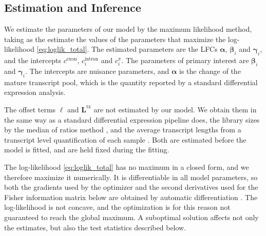 \documentclass[11pt]{article}
\begin{document}
	\subsection{Estimation and Inference} \label{subsec:estimation_inference}
	We estimate the parameters of our model by the maximum likelihood method, taking as the estimate the values of the parameters that maximize the log-likelihood \eqref{eq:loglik_total}. The estimated parameters are the LFCs $\boldsymbol{\alpha}$, $\boldsymbol{\beta}_i$ and $\boldsymbol{\gamma}_i$, and the intercepts $c^{\mathrm{exon}}$, $c^{\mathrm{intron}}_{i}$ and $c^{\pi}_{i}$. The parameters of primary interest are $\boldsymbol{\beta}_i$ and $\boldsymbol{\gamma}_i$. The intercepts are nuisance parameters, and $\boldsymbol{\alpha}$ is the change of the mature transcript pool, which is the quantity reported by a standard differential expression analysis.

	The offset terms $\boldsymbol{\ell}$ and $\boldsymbol{L}^{\mathrm{tx}}$ are not estimated by our model. We obtain them in the same way as a standard differential expression pipeline does, the library sizes by the median of ratios method \citep{andersDifferentialExpressionAnalysis2010, loveModeratedEstimationFold2014}, and the average transcript lengths from a transcript level quantification of each sample \citep{sonesonDifferentialAnalysesRNAseq2016, patroSalmonProvidesFast2017}. Both are estimated before the model is fitted, and are held fixed during the fitting.

	The log-likelihood \eqref{eq:loglik_total} has no maximum in a closed form, and we therefore maximize it numerically. It is differentiable in all model parameters, so both the gradients used by the optimizer and the second derivatives used for the Fisher information matrix below are obtained by automatic differentiation \citep{anselPyTorch2Faster2024}. The log-likelihood is not concave, and the optimization is for this reason not guaranteed to reach the global maximum. A suboptimal solution affects not only the estimates, but also the test statistics described below.
\end{document}
